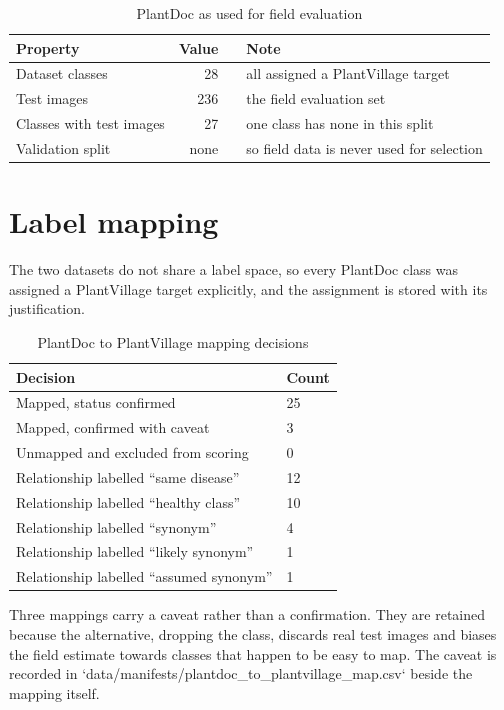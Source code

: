 \begin{table}[H]
\centering
\caption{PlantDoc as used for field evaluation}
\label{tab:pdsplits}
\tabfont
\begin{tabularx}{\textwidth}{@{}lrrY@{}}
\toprule
\textbf{Property} & \textbf{Value} & & \textbf{Note} \\
\midrule
Dataset classes & 28 & & all assigned a PlantVillage target \\
Test images & 236 & & the field evaluation set \\
Classes with test images & 27 & & one class has none in this split \\
Validation split & none & & so field data is never used for selection \\
\bottomrule
\end{tabularx}
\end{table}

\section{Label mapping}

The two datasets do not share a label space, so every PlantDoc class was assigned a
PlantVillage target explicitly, and the assignment is stored with its justification.

\begin{table}[H]
\centering
\caption{PlantDoc to PlantVillage mapping decisions}
\label{tab:mapping}
\tabfont
\begin{tabularx}{\textwidth}{@{}lY@{}}
\toprule
\textbf{Decision} & \textbf{Count} \\
\midrule
Mapped, status confirmed & 25 \\
Mapped, confirmed with caveat & 3 \\
Unmapped and excluded from scoring & 0 \\
\midrule
Relationship labelled ``same disease'' & 12 \\
Relationship labelled ``healthy class'' & 10 \\
Relationship labelled ``synonym'' & 4 \\
Relationship labelled ``likely synonym'' & 1 \\
Relationship labelled ``assumed synonym'' & 1 \\
\bottomrule
\end{tabularx}
\end{table}

Three mappings carry a caveat rather than a confirmation. They are retained because
the alternative, dropping the class, discards real test images and biases the field
estimate towards classes that happen to be easy to map. The caveat is recorded in
`data/manifests/plantdoc\_to\_plantvillage\_map.csv` beside the mapping itself.


